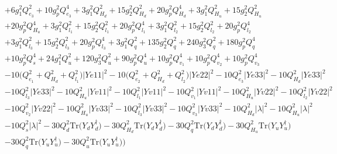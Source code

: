 {\begin{align}
 &+6 g_{1}^{2} Q_{e_3}^{2} +10 g_{p}^{2} Q_{e_3}^{4} +3 g_{1}^{2} Q_{H_d}^{2} +15 g_{2}^{2} Q_{H_d}^{2} +20 g_{p}^{2} Q_{H_d}^{4} +3 g_{1}^{2} Q_{H_u}^{2} +15 g_{2}^{2} Q_{H_u}^{2} \nonumber \\ 
 &+20 g_{p}^{2} Q_{H_u}^{4} +3 g_{1}^{2} Q_{l_1}^{2} +15 g_{2}^{2} Q_{l_1}^{2} +20 g_{p}^{2} Q_{l_1}^{4} +3 g_{1}^{2} Q_{l_2}^{2} +15 g_{2}^{2} Q_{l_2}^{2} +20 g_{p}^{2} Q_{l_2}^{4} \nonumber \\ 
 &+3 g_{1}^{2} Q_{l_3}^{2} +15 g_{2}^{2} Q_{l_3}^{2} +20 g_{p}^{2} Q_{l_3}^{4} +3 g_{1}^{2} Q_{q}^{2} +135 g_{2}^{2} Q_{q}^{2} +240 g_{3}^{2} Q_{q}^{2} +180 g_{p}^{2} Q_{q}^{4} \nonumber \\ 
 &+10 g_{p}^{2} Q_{s}^{4} +24 g_{1}^{2} Q_{u}^{2} +120 g_{3}^{2} Q_{u}^{2} +90 g_{p}^{2} Q_{u}^{4} +10 g_{p}^{2} Q_{v_1}^{4} +10 g_{p}^{2} Q_{v_2}^{4} +10 g_{p}^{2} Q_{v_3}^{4} \nonumber \\ 
 &-10 \Big(Q_{e_{1}}^{2} + Q_{H_d}^{2} + Q_{l_1}^{2}\Big)|Ye11|^2 -10 \Big(Q_{e_{2}}^{2} + Q_{H_d}^{2} + Q_{l_2}^{2}\Big)|Ye22|^2 -10 Q_{e_3}^{2} |Ye33|^2 -10 Q_{H_d}^{2} |Ye33|^2 \nonumber \\ 
 &-10 Q_{l_3}^{2} |Ye33|^2 -10 Q_{H_u}^{2} |Yv11|^2 -10 Q_{l_1}^{2} |Yv11|^2 -10 Q_{v_1}^{2} |Yv11|^2 -10 Q_{H_u}^{2} |Yv22|^2 -10 Q_{l_2}^{2} |Yv22|^2 \nonumber \\ 
 &-10 Q_{v_2}^{2} |Yv22|^2 -10 Q_{H_u}^{2} |Yv33|^2 -10 Q_{l_3}^{2} |Yv33|^2 -10 Q_{v_3}^{2} |Yv33|^2 -10 Q_{H_d}^{2} |\lambda|^2 -10 Q_{H_u}^{2} |\lambda|^2 \nonumber \\ 
 &-10 Q_{s}^{2} |\lambda|^2 -30 Q_{d}^{2} \mbox{Tr}\Big({Y_d  Y_{d}^{\dagger}}\Big) -30 Q_{H_d}^{2} \mbox{Tr}\Big({Y_d  Y_{d}^{\dagger}}\Big) -30 Q_{q}^{2} \mbox{Tr}\Big({Y_d  Y_{d}^{\dagger}}\Big) -30 Q_{H_u}^{2} \mbox{Tr}\Big({Y_u  Y_{u}^{\dagger}}\Big) \nonumber \\ 
 &-30 Q_{q}^{2} \mbox{Tr}\Big({Y_u  Y_{u}^{\dagger}}\Big) -30 Q_{u}^{2} \mbox{Tr}\Big({Y_u  Y_{u}^{\dagger}}\Big) \Big)
\end{align}} 
